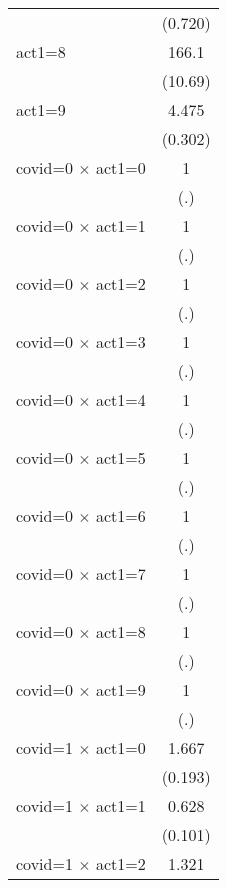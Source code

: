 {\begin{tabular}{l*{1}{c}}
                    &     (0.720)         \\
[1em]
act1=8              &       166.1\sym{***}\\
                    &     (10.69)         \\
[1em]
act1=9              &       4.475\sym{***}\\
                    &     (0.302)         \\
[1em]
covid=0 $\times$ act1=0&           1         \\
                    &         (.)         \\
[1em]
covid=0 $\times$ act1=1&           1         \\
                    &         (.)         \\
[1em]
covid=0 $\times$ act1=2&           1         \\
                    &         (.)         \\
[1em]
covid=0 $\times$ act1=3&           1         \\
                    &         (.)         \\
[1em]
covid=0 $\times$ act1=4&           1         \\
                    &         (.)         \\
[1em]
covid=0 $\times$ act1=5&           1         \\
                    &         (.)         \\
[1em]
covid=0 $\times$ act1=6&           1         \\
                    &         (.)         \\
[1em]
covid=0 $\times$ act1=7&           1         \\
                    &         (.)         \\
[1em]
covid=0 $\times$ act1=8&           1         \\
                    &         (.)         \\
[1em]
covid=0 $\times$ act1=9&           1         \\
                    &         (.)         \\
[1em]
covid=1 $\times$ act1=0&       1.667\sym{***}\\
                    &     (0.193)         \\
[1em]
covid=1 $\times$ act1=1&       0.628\sym{**} \\
                    &     (0.101)         \\
[1em]
covid=1 $\times$ act1=2&       1.321\sym{*}  \\

\end{tabular}}
